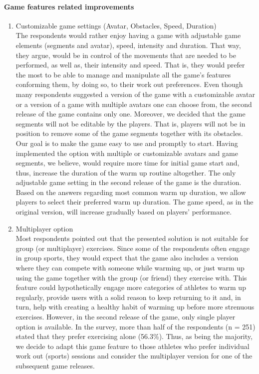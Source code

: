 \paragraph{Game features related improvements}
\begin{enumerate}
	\item Customizable game settings (Avatar, Obstacles, Speed, Duration)\\
The respondents would rather enjoy having a game with adjustable game elements (segments and avatar), speed, intensity and duration. That way, they argue, would be in control of the movements that are needed to be performed, as well as, their intensity and speed. That is, they would prefer the most to be able to manage and manipulate all the game's features conforming them, by doing so, to their work out preferences. Even though many respondents suggested a version of the game with a customizable avatar or a version of a game with multiple avatars one can choose from, the second release of the game contains only one. Moreover, we decided that the game segments will not be editable by the players. That is, players will not be in position to remove some of the game segments together with its obstacles. Our goal is to make the game easy to use and promptly to start. Having implemented the option with multiple or customizable avatars and game segments, we believe, would require more time for initial game start and, thus, increase the duration of the warm up routine altogether. The only adjustable game setting in the second release of the game is the duration. Based on the answers regarding most common warm up duration, we allow players to select their preferred warm up duration. The game speed, as in the original version, will increase gradually based on players' performance.  
\item Multiplayer option\\
Most respondents pointed out that the presented solution is not suitable for group (or multiplayer) exercises. Since some of the respondents often engage in group sports, they would expect that the game also includes a version where they can compete with someone while warming up, or just warm up using the game together with the group (or friend) they exercise with. This feature could hypothetically engage more categories of athletes to warm up regularly, provide users with a solid reason to keep returning to it and, in turn, help with creating a healthy habit of warming up before more strenuous exercises. However, in the second release of the game, only single player option is available. In the survey, more than half of the respondents (n = 251) stated that they prefer exercising alone (56.3\%). Thus, as being the majority, we decide to adapt this game feature to those athletes who prefer individual work out (sports) sessions and consider the multiplayer version for one of the subsequent game releases. 
\end{enumerate}
